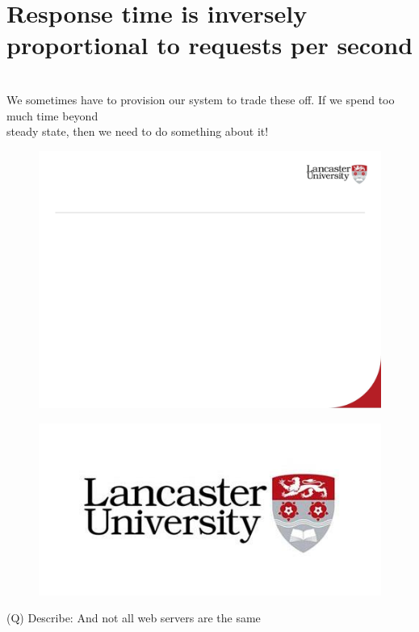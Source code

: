 \documentclass[12pt]{article}
\begin{document}
\section{Response time is inversely proportional to requests per second}
\\
We sometimes have to provision our system to trade these off.  If we spend too much time beyond \\
steady state, then we need to do something about it!\\
\begin{figure}[H]
\includegraphics[width=0.5\linewidth]{page67-image-1.png}
\end{figure}
\begin{figure}[H]
\includegraphics[width=0.5\linewidth]{page67-image-2.png}
\end{figure}
\clearpage
(Q)
Describe: And not all web servers are the same
\clearpage
\end{document}
